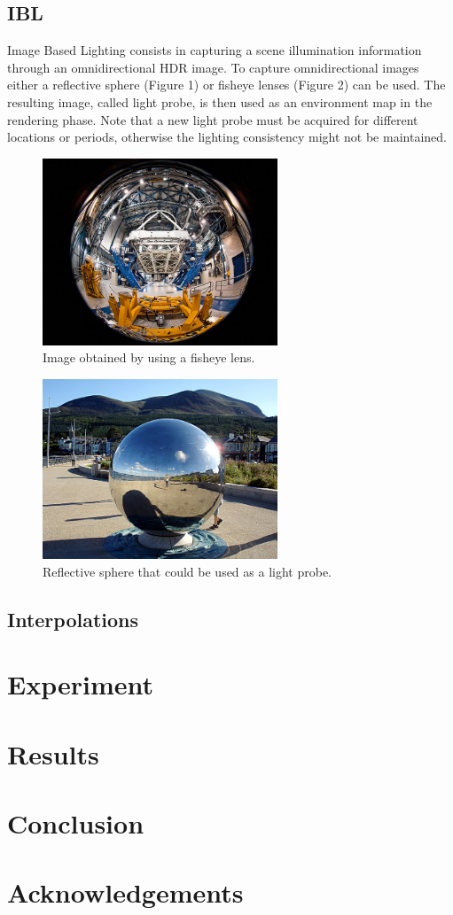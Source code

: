 \documentclass[conference]{acmsiggraph}
\begin{document}
	\subsection{IBL}

		Image Based Lighting \cite{debevec2002} consists in capturing a scene illumination information through an omnidirectional HDR image. To capture omnidirectional images either a reflective sphere (Figure 1\cite{linda}) or fisheye lenses (Figure 2\cite{salgado}) can be used. The resulting image, called light probe, is then used as an environment map in the rendering phase. Note that a new light probe must be acquired for different locations or periods, otherwise the lighting consistency might not be maintained.

		\begin{figure}[h!]
  			\caption{Image obtained by using a fisheye lens.}
 			 \centering
			\includegraphics[width=7cm]{images/fisheye.jpg}
		\end{figure}

		\begin{figure}[h!]
  			\caption{Reflective sphere that could be used as a light probe.}
 			 \centering
		\includegraphics[width=7cm]{images/lightprobe.jpg}
		\end{figure}


	\subsection{Interpolations}

\section{Experiment}

\section{Results}

\section{Conclusion}

\section*{Acknowledgements}



\end{document}
